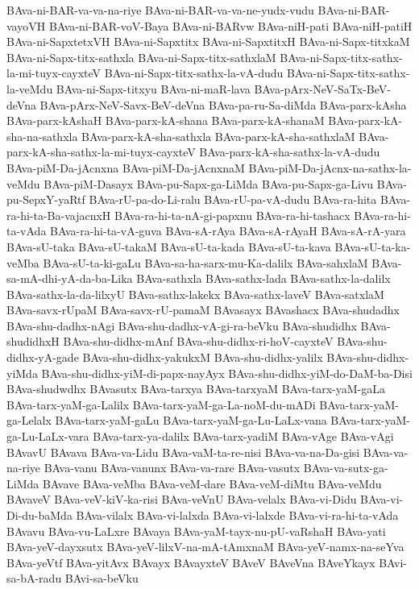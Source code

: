 {BAva-ni-BAR-va-va-na-riye
BAva-ni-BAR-va-va-ne-yudx-vudu
BAva-ni-BAR-vayoVH
BAva-ni-BAR-voV-Baya
BAva-ni-BARvw
BAva-niH-pati
BAva-niH-patiH
BAva-ni-SapxtetxVH
BAva-ni-Sapxtitx
BAva-ni-SapxtitxH
BAva-ni-Sapx-titxkaM
BAva-ni-Sapx-titx-sathxla
BAva-ni-Sapx-titx-sathxlaM
BAva-ni-Sapx-titx-sathx-la-mi-tuyx-cayxteV
BAva-ni-Sapx-titx-sathx-la-vA-dudu
BAva-ni-Sapx-titx-sathx-la-veMdu
BAva-ni-Sapx-titxyu
BAva-ni-maR-lava
BAva-pArx-NeV-SaTx-BeV-deVna
BAva-pArx-NeV-Savx-BeV-deVna
BAva-pa-ru-Sa-diMda
BAva-parx-kAsha
BAva-parx-kAshaH
BAva-parx-kA-shana
BAva-parx-kA-shanaM
BAva-parx-kA-sha-na-sathxla
BAva-parx-kA-sha-sathxla
BAva-parx-kA-sha-sathxlaM
BAva-parx-kA-sha-sathx-la-mi-tuyx-cayxteV
BAva-parx-kA-sha-sathx-la-vA-dudu
BAva-piM-Da-jAcnxna
BAva-piM-Da-jAcnxnaM
BAva-piM-Da-jAcnx-na-sathx-la-veMdu
BAva-piM-Dasayx
BAva-pu-Sapx-ga-LiMda
BAva-pu-Sapx-ga-Livu
BAva-pu-SepxY-yaRtf
BAva-rU-pa-do-Li-ralu
BAva-rU-pa-vA-dudu
BAva-ra-hita
BAva-ra-hi-ta-Ba-vajacnxH
BAva-ra-hi-ta-nA-gi-papxnu
BAva-ra-hi-tashacx
BAva-ra-hi-ta-vAda
BAva-ra-hi-ta-vA-guva
BAva-sA-rAya
BAva-sA-rAyaH
BAva-sA-rA-yara
BAva-sU-taka
BAva-sU-takaM
BAva-sU-ta-kada
BAva-sU-ta-kava
BAva-sU-ta-ka-veMba
BAva-sU-ta-ki-gaLu
BAva-sa-ha-sarx-mu-Ka-dalilx
BAva-sahxlaM
BAva-sa-mA-dhi-yA-da-ba-Lika
BAva-sathxla
BAva-sathx-lada
BAva-sathx-la-dalilx
BAva-sathx-la-da-lilxyU
BAva-sathx-lakekx
BAva-sathx-laveV
BAva-satxlaM
BAva-savx-rUpaM
BAva-savx-rU-pamaM
BAvasayx
BAvashacx
BAva-shudadhx
BAva-shu-dadhx-nAgi
BAva-shu-dadhx-vA-gi-ra-beVku
BAva-shudidhx
BAva-shudidhxH
BAva-shu-didhx-mAnf
BAva-shu-didhx-ri-hoV-cayxteV
BAva-shu-didhx-yA-gade
BAva-shu-didhx-yakukxM
BAva-shu-didhx-yalilx
BAva-shu-didhx-yiMda
BAva-shu-didhx-yiM-di-papx-nayAyx
BAva-shu-didhx-yiM-do-DaM-ba-Disi
BAva-shudwdhx
BAvasutx
BAva-tarxya
BAva-tarxyaM
BAva-tarx-yaM-gaLa
BAva-tarx-yaM-ga-Lalilx
BAva-tarx-yaM-ga-La-noM-du-mADi
BAva-tarx-yaM-ga-Lelalx
BAva-tarx-yaM-gaLu
BAva-tarx-yaM-ga-Lu-LaLx-vana
BAva-tarx-yaM-ga-Lu-LaLx-vara
BAva-tarx-ya-dalilx
BAva-tarx-yadiM
BAva-vAge
BAva-vAgi
BAvavU
BAvava
BAva-va-Lidu
BAva-vaM-ta-re-nisi
BAva-va-na-Da-gisi
BAva-va-na-riye
BAva-vanu
BAva-vanunx
BAva-va-rare
BAva-vasutx
BAva-va-sutx-ga-LiMda
BAvave
BAva-veMba
BAva-veM-dare
BAva-veM-diMtu
BAva-veMdu
BAvaveV
BAva-veV-kiV-ka-risi
BAva-veVnU
BAva-velalx
BAva-vi-Didu
BAva-vi-Di-du-baMda
BAva-vilalx
BAva-vi-lalxda
BAva-vi-lalxde
BAva-vi-ra-hi-ta-vAda
BAvavu
BAva-vu-LaLxre
BAvaya
BAva-yaM-tayx-nu-pU-vaRshaH
BAva-yati
BAva-yeV-dayxsutx
BAva-yeV-lilxV-na-mA-tAmxnaM
BAva-yeV-namx-na-seYva
BAva-yeVtf
BAva-yitAvx
BAvayx
BAvayxteV
BAveV
BAveVna
BAveYkayx
BAvi-sa-bA-radu
BAvi-sa-beVku
}
